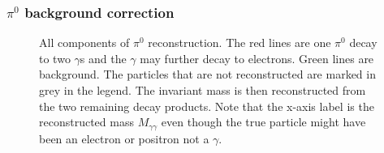 \subsubsection{\texorpdfstring {$\pi^0$ background correction}{pi0 background correction}}
\label{sec:pi0bkgcorrection}
\begin{figure}[H]
  \centering     
  \caption{All components of $\pi^0$ reconstruction. The red lines are one $\pi^0$ decay to two $\gamma$s and the $\gamma$ may further decay to electrons. Green lines are background. The particles that are not reconstructed are marked in grey in the legend. The invariant mass is then reconstructed from the two remaining decay products. Note that the x-axis label is the reconstructed mass $M_{\gamma\gamma}$ even though the true particle might have been an electron or positron not a $\gamma$.}
  \label{fig:pi0_component}
\end{figure}
